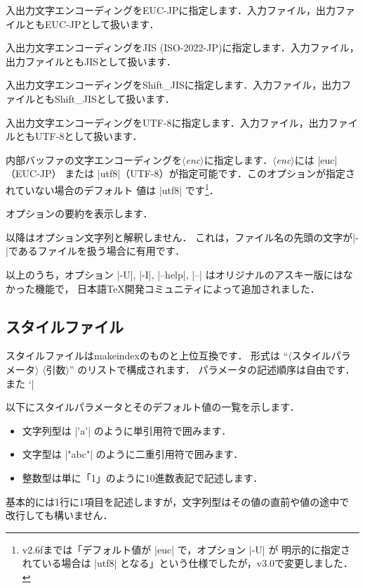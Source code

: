 \documentclass[a4paper]{jsarticle}
\newcommand{\SoftName}[1]{\textsf{#1}}
\newcommand{\Meta}[1]{$\langle$\mbox{}\textit{#1}\mbox{}$\rangle$}
\newcommand{\jMeta}[1]{$\langle$\mbox{}\textsf{#1}\mbox{}$\rangle$}
\begin{document}
\begin{description}[leftmargin=2cm]
\item[|-E|]
入出力文字エンコーディングをEUC-JPに指定します．入力ファイル，出力ファイルともEUC-JPとして扱います．

\item[|-J|]
入出力文字エンコーディングをJIS (ISO-2022-JP)に指定します．入力ファイル，出力ファイルともJISとして扱います．

\item[|-S|]
入出力文字エンコーディングをShift\_JISに指定します．入力ファイル，出力ファイルともShift\_JISとして扱います．

\item[|-U|]
入出力文字エンコーディングをUTF-8に指定します．入力ファイル，出力ファイルともUTF-8として扱います．

\item[|-I| \Meta{enc}]
内部バッファの文字エンコーディングを\Meta{enc}に指定します．\Meta{enc}には |euc|（EUC-JP）
または |utf8|（UTF-8）が指定可能です．このオプションが指定されていない場合のデフォルト
値は |utf8| です\footnote{v2.6fまでは「デフォルト値が |euc| で，オプション |-U| が
明示的に指定されている場合は |utf8| となる」という仕様でしたが，v3.0で変更しました．}．

\item[|--help|]
オプションの要約を表示します．

\item[|--|]
以降はオプション文字列と解釈しません．
これは，ファイル名の先頭の文字が|-|であるファイルを扱う場合に有用です．
\end{description}

以上のうち，オプション |-U|, |-I|, |--help|, |--| はオリジナルのアスキー版にはなかった機能で，
日本語\TeX 開発コミュニティによって追加されました．

\subsection{スタイルファイル}

スタイルファイルは\SoftName{makeindex}のものと上位互換です．
形式は ``\jMeta{スタイルパラメータ} \jMeta{引数}'' のリストで構成されます．
パラメータの記述順序は自由です．また `|%

以下にスタイルパラメータとそのデフォルト値の一覧を示します．
\begin{itemize}
 \item 文字列型は |'a'| のように単引用符で囲みます．
 \item 文字型は |"abc"| のように二重引用符で囲みます．
 \item 整数型は単に「1」のように10進数表記で記述します．
\end{itemize}
基本的には1行に1項目を記述しますが，文字列型はその値の直前や値の途中で
改行しても構いません．
\end{document}
